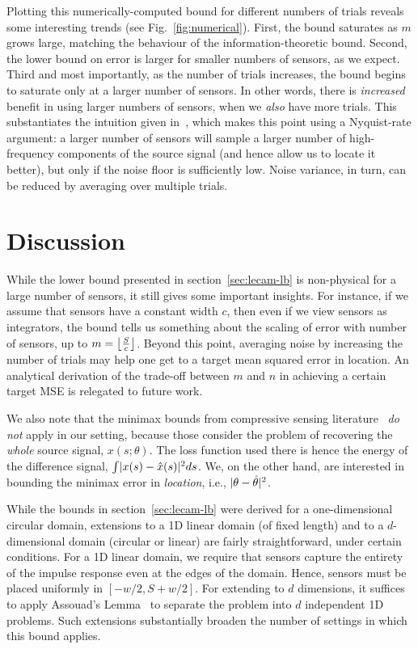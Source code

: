\documentclass[conference]{IEEEtran}
\DeclarePairedDelimiter\abs{\lvert}{\rvert}
\DeclarePairedDelimiter\floor{\lfloor}{\rfloor}
\begin{document}
Plotting this numerically-computed bound for different numbers of trials
reveals some interesting trends (see Fig.~\ref{fig:numerical}). First, the
bound saturates as $m$ grows large, matching the behaviour of the
information-theoretic bound. Second, the lower bound on error is larger for
smaller numbers of sensors, as we expect. Third and most importantly, as the
number of trials increases, the bound begins to saturate only at a larger
number of sensors. In other words, there is \emph{increased} benefit in using
larger numbers of sensors, when we \emph{also} have more trials. This
substantiates the intuition given in~\cite{Grover2016Information}, which makes
this point using a Nyquist-rate argument: a larger number of sensors will
sample a larger number of high-frequency components of the source signal (and
hence allow us to locate it better), but only if the noise floor is
sufficiently low. Noise variance, in turn, can be reduced by averaging over
multiple trials.

\section{Discussion}
\label{sec:discussion}

While the lower bound presented in section~\ref{sec:lecam-lb} is non-physical
for a large number of sensors, it still gives some important insights. For
instance, if we assume that sensors have a constant width $c$, then even if we
view sensors as integrators, the bound tells us something about the scaling of
error with number of sensors, up to $m = \floor*{\frac{S}{c}}$. Beyond this
point, averaging noise by increasing the number of trials may help one get to a
target mean squared error in location. An analytical derivation of the
trade-off between $m$ and $n$ in achieving a certain target MSE is relegated to
future work.

We also note that the minimax bounds from compressive sensing
literature~\cite{AriasCastro2013Fundamental} \emph{do not} apply in our
setting, because those consider the problem of recovering the \emph{whole}
source signal, $x(s;\theta)$. The loss function used there is hence the energy
of the difference signal, $\int \abs{x(s) - \hat x(s)}^2 ds$. We, on the other
hand, are interested in bounding the minimax error in \emph{location}, i.e.,
$\abs{\theta - \hat\theta}^2$.

While the bounds in section~\ref{sec:lecam-lb} were derived for a
one-dimensional circular domain, extensions to a 1D linear domain (of fixed
length) and to a $d$-dimensional domain (circular or linear) are fairly
straightforward, under certain conditions. For a 1D linear domain, we require
that sensors capture the entirety of the impulse response even at the edges of
the domain. Hence, sensors must be placed uniformly in $[-w/2, S{+}w/2]$. For
extending to $d$ dimensions, it suffices to apply Assouad's
Lemma~\cite{Tsybakov2009Introduction} to separate the problem into $d$
independent 1D problems. Such extensions substantially broaden the number of
settings in which this bound applies.
\end{document}
